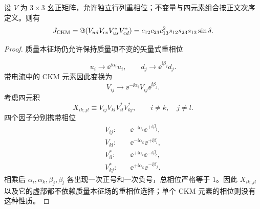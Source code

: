 \begin{proposition}[三阶幺正混合矩阵的重相位不变量]
设 $V$ 为 $3\times3$ 幺正矩阵，允许独立行列重相位；不变量与四元素组合按正文次序定义。则有
\begin{equation}
 {
 J_{\rm CKM}
 =\Im\!\left(V_{ud}V_{cs}V_{us}^*V_{cd}^*\right)
 =c_{12}c_{23}c_{13}^2s_{12}s_{23}s_{13}\sin\delta.}
\label{eq:jarlskog-dp11}
\end{equation}
\end{proposition}
\begin{proof}
质量本征场仍允许保持质量项不变的矢量式重相位

\begin{equation*}
 u_i\to \ee^{\ii\alpha_i}u_i,
 \qquad
 d_j\to \ee^{\ii\beta_j}d_j.
\end{equation*}
带电流中的 CKM 元素因此变换为
\begin{equation*}
 V_{ij}\to
 \ee^{-\ii\alpha_i}V_{ij}\ee^{\ii\beta_j}.
\end{equation*}
考虑四元积
\begin{equation*}
 X_{ik;jl}\equiv V_{ij}V_{kl}V_{il}^*V_{kj}^*,
 \qquad i\neq k,
 \quad j\neq l.
\end{equation*}
四个因子分别携带相位
\begin{align*}
 V_{ij}:&\quad \ee^{-\ii\alpha_i}\ee^{+\ii\beta_j},\\
 V_{kl}:&\quad \ee^{-\ii\alpha_k}\ee^{+\ii\beta_l},\\
 V_{il}^*:&\quad \ee^{+\ii\alpha_i}\ee^{-\ii\beta_l},\\
 V_{kj}^*:&\quad \ee^{+\ii\alpha_k}\ee^{-\ii\beta_j}.
\end{align*}
相乘后 $\alpha_i,\alpha_k,\beta_j,\beta_l$ 各出现一次正号和一次负号，总相位严格等于 $1$。因此 $X_{ik;jl}$ 以及它的虚部都不依赖质量本征场的重相位选择；单个 CKM 元素的相位则没有这种性质。


\end{proof}

